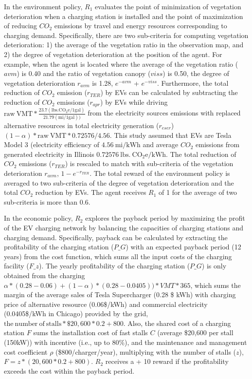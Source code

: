 \documentclass[preprint,12pt]{elsarticle}
\begin{document}
In the environment policy, $R_1$ evaluates the point of minimization of vegetation deterioration when a charging station is installed and the point of maximization of reducing $CO_2$ emissions by travel and energy resources corresponding to charging demand. Specifically, there are two sub-criteria for computing vegetation deterioration: 1) the average of the vegetation ratio in the observation map, and 2) the degree of vegetation deterioration at the position of the agent. For example, when the agent is located where the average of the vegetation ratio ($avm$) is 0.40 and the ratio of vegetation canopy ($viss$) is 0.50, the degree of vegetation deterioration $r_{avm}$ is 1.28, $e^{-avm}$ + $e^{-viss}$. Furthermore, the total reduction of $CO_2$ emission ($r_{TER}$) by EVs can be calculated by subtracting the reduction of $CO_2$ emissions ($r_{apr}$) by EVs while driving $\mathrm{raw\:VMT} * \frac{23.7 (\mathrm{lbs.CO_2e/1gal})}{21.79 (\mathrm{mi/1gal}))}$ from the electricity sources emissions with replaced alternative resources in total electricity generation ($r_{eser}$) $(1-\alpha)*\mathrm{raw\:VMT} * 0.72576 / 4.56$. This study assumed that EVs are Tesla Model 3 (electricity efficiency of $4.56 \: \mathrm{mi/kWh}$ and average $CO_2$ emissions from generated electricity in Illinois $0.72576 \: \mathrm{lbs. \: CO_2e/kWh}$. The total reduction of $CO_2$ emissions ($r_{TER}$) is rescaled to match with sub-criteria of the vegetation deterioration $r_{avm}$, $1-e^{-r_{TER}}$. The total reward of the environment policy is averaged to two sub-criteria of the degree of vegetation deterioration and the total $CO_2$ reduction by EVs. The agent receives $R_1$ of 1 for the average of two sub-criteria is more than 0.6. 

In the economic policy, $R_2$ explores the payback period by maximizing the profit of the EV charging network by balancing the capacities of charging stations and charging demand. Specifically, payback can be calculated by extracting the profitability of the charging station ($P\_G$) with an expected payback period (12 years) from the cost function, which sums all the input costs of the charging facility ($F\_z$). The yearly profitability of the charging station ($P\_G$) is only obtained from the charging $\alpha*(0.28-0.06) + (1-\alpha)*(0.28-0.0405)) * VMT * 365$, which sums the margin of the average sales of Tesla Supercharger (0.28 \$ kWh) with charging price of alternative resource (0.06\$/kWh) and commercial electricity (0.0405\$/kWh in Chicago) provided by the grid, $\mathrm{the \: number \: of \: stalls} * \$20,600 * 0.2 + 800$. Also, the shared cost of a charging station $F$ sums the installation cost of fast stalls $C$ (average \$20,600 per stall (150kW)) with incentive (i.e., up to 80\%), and the maintenance and management cost coefficient $\rho$ (\$800/charger/year), multiplying with the number of stalls ($z$), $F = z * (20,600*0.2 + 800)$. $R_2$ receives a + 10 reward if the profitability exceeds the cost within the payback period.
\end{document}
